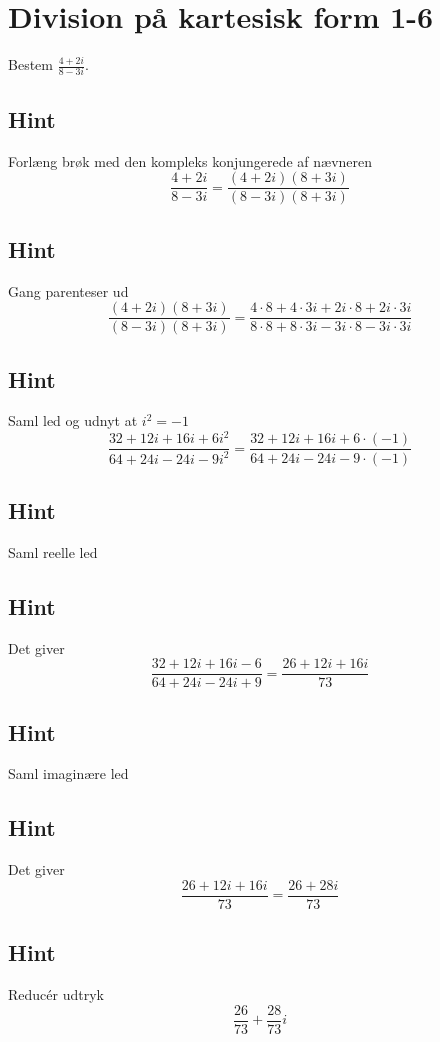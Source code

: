 \documentclass{article}
\newenvironment{exercise}[1]{\newpage\section{#1}}{}
\newcommand{\answerbox}[1]{\fbox{$#1$}}
\newcommand{\hint}{\subsection*{Hint}}
\begin{document}
\begin{exercise}{Division på kartesisk form 1-6}
	
	Bestem $\frac{4+2i}{8-3i}$.
	
	\answerbox{	\frac{26}{73} + \frac{28}{73}i}
	
	
	\hint 
	
	Forlæng brøk med den kompleks konjungerede af nævneren
	\[
	\frac{4+2i}{8-3i} = \frac{(4+2i)(8+3i)}{(8-3i)(8+3i)}
	\]
	
	\hint
	
	Gang parenteser ud
	\[
	\frac{(4+2i)(8+3i)}{(8-3i)(8+3i)} = \frac{4 \cdot 8 + 4 \cdot 3i + 2i \cdot 8 + 2i \cdot 3i}{8 \cdot 8 + 8 \cdot 3i - 3i \cdot 8 -3i \cdot 3i}
	\]
	
	\hint 
	
	Saml led og udnyt at $i^2 = -1$
	\[
	 \frac{32+12i+16i+6i^2}{64+24i-24i-9i^2} = \frac{32+12i+16i+6 \cdot (-1)}{64+24i-24i-9 \cdot (-1)}
	\]
	
	\hint
	
	Saml reelle led
	
	\hint
	
	Det giver
	\[
	\frac{32+12i+16i- 6}{64+24i-24i+9 } = \frac{26+12i +16i}{73}
	\]
	
	\hint
	
	Saml imaginære led
	
	
	\hint
	
	Det giver 
	\[
	\frac{26+12i +16i}{73} = \frac{26+28i}{73}
	\]
	
	\hint
	
	Reducér udtryk
	\[
	\frac{26}{73} + \frac{28}{73}i
	\]
	
\end{exercise}

\newpage
\end{document}
